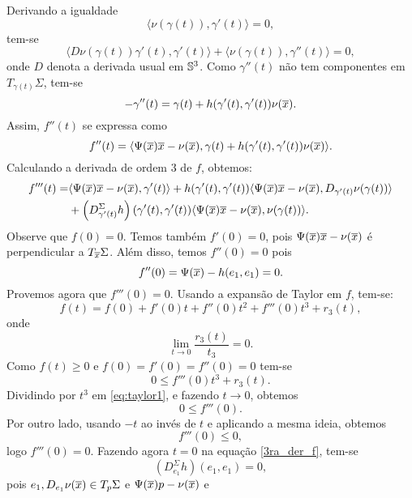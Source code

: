 \begin{demonstracao}
\begin{equation*}
\end{equation*}
Derivando a igualdade
\[
\langle \nu(\gamma(t)), \gamma'(t) \rangle = 0,
\]
tem-se
\[
\langle D \nu(\gamma(t)) \gamma'(t), \gamma'(t) \rangle + 
\langle \nu(\gamma(t)), \gamma''(t) \rangle = 0,
\]
onde $D$ denota a derivada usual em $\mathbb{S}^3$. Como $\gamma''(t)$ 
não tem componentes em $T_{\gamma(t)} \Sigma$, tem-se
\begin{equation*}
-\gamma''(t) = \gamma(t) + h(\gamma'(t), \gamma'(t)) \nu(\overline{x}).
\end{equation*}
Assim, $f''(t)$ se expressa como
\begin{equation*}
f''(t) = \langle \Psi(\overline{x}) \overline{x} - \nu(\overline{x}), \gamma(t) + h(\gamma'(t), 
\gamma'(t)) \nu(\overline{x}) \rangle.
\end{equation*}
Calculando a derivada de ordem $3$ de $f$, obtemos:
\begin{eqnarray}\label{3ra_der_f}
\begin{aligned}
f'''(t) =& \langle \Psi(\overline{x})\overline{x} - \nu(\overline{x}), \gamma'(t) \rangle + h(\gamma'(t), 
\gamma'(t)) \langle \Psi(\overline{x})\overline{x} - \nu(\overline{x}), D_{\gamma'(t)} \nu(\gamma(t)) 
\rangle \\
&+ \left( D_{\gamma'(t)}^{\Sigma} h \right) (\gamma'(t), \gamma'(t)) 
\langle \Psi(\overline{x})\overline{x} - \nu(\overline{x}), \nu(\gamma(t)) \rangle.
\end{aligned}
\end{eqnarray}
Observe que $f(0)=0$. Temos também $f'(0)=0$, pois 
$\Psi(\overline{x})\overline{x}-\nu(\overline{x})$ \'e perpendicular a $T_{\overline{x}}\Sigma$. 
Al\'em disso, temos $f''(0)=0$ pois
\[
f''(0) = \Psi(\overline{x}) - h(e_1,e_1)=0.
\]
Provemos agora que $f'''(0)=0$. Usando a expansão de Taylor em $f$,
tem-se:
\begin{equation*}
f(t) = f(0) + f'(0)t + f''(0)t^2 + f'''(0)t^3 + r_3(t),
\end{equation*}  
onde
\[
\lim_{t \rightarrow 0} \frac{r_3(t)}{t_3}=0.
\]
Como $f(t) \geq 0$ e $f(0)=f'(0)=f''(0)=0$ tem-se
\begin{equation} \label{eq:taylor1}
0 \leq f'''(0) t^3 + r_3(t).
\end{equation}
Dividindo por $t^3$ em \eqref{eq:taylor1}, e fazendo $t\to0$, obtemos
\[
0 \leq f'''(0).
\]
Por outro lado, usando $-t$ ao inv\'es de $t$ e aplicando a mesma ideia,
obtemos
\[
f'''(0) \leq 0,
\]
logo $f'''(0)=0$. Fazendo agora $t=0$ na equa\c c\~ao \eqref{3ra_der_f},
tem-se 
\begin{equation} \label{eq:taylor2}
(D_{e_1}^{\Sigma} h) (e_1,e_1) = 0,
\end{equation}
pois $e_1, D_{e_1} \nu(\overline{x}) \in T_p \Sigma$ e $\Psi(\overline{x})p - \nu(\overline{x})$ e 

\end{demonstracao}

